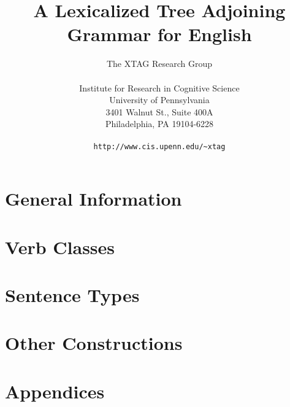 \documentclass{report}
\title{A  Lexicalized Tree Adjoining Grammar for English}
\author{The XTAG Research Group \\ \\
Institute for Research in Cognitive Science\\
University of Pennsylvania \\
3401 Walnut St., Suite 400A \\
Philadelphia, PA 19104-6228 \\ \\
{\tt http://www.cis.upenn.edu/\~{}xtag}
}
\begin{document}
\setcounter{bottomnumber}{20}
\setcounter{topnumber}{20}
\renewcommand{\bottomfraction}{1}
\renewcommand{\topfraction}{1}
\setcounter{totalnumber}{30}
\renewcommand{\textfraction}{0}
\renewcommand{\floatpagefraction}{0}

\pagestyle{plain}

\maketitle
{}
\newpage\setcounter{page}{0}\mbox{}\newpage
\tableofcontents
\listoffigures


{}
\pagestyle{headings}
\part{General Information}




\part{Verb Classes}









\part{Sentence Types}






\part{Other Constructions}






\part{Appendices}









\end{document}
